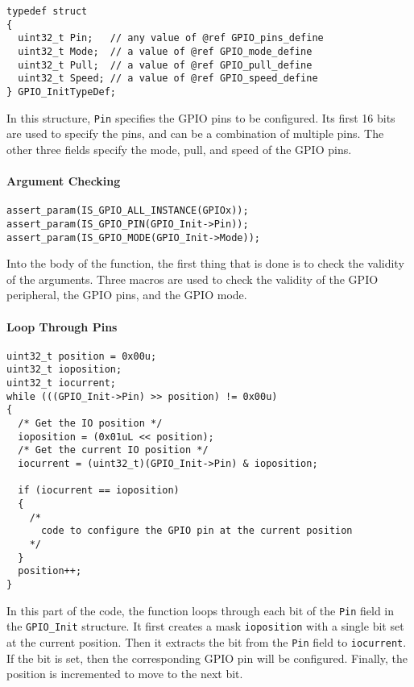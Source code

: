 \documentclass[a4paper,12pt]{article}
\begin{document}
\begin{verbatim}
typedef struct
{
  uint32_t Pin;   // any value of @ref GPIO_pins_define
  uint32_t Mode;  // a value of @ref GPIO_mode_define
  uint32_t Pull;  // a value of @ref GPIO_pull_define
  uint32_t Speed; // a value of @ref GPIO_speed_define
} GPIO_InitTypeDef;    
\end{verbatim}

In this structure, \texttt{Pin} specifies the GPIO pins to be configured. Its first 16 bits are used to specify the pins, and can be a combination of multiple pins. The other three fields specify the mode, pull, and speed of the GPIO pins.

\paragraph{Argument Checking}

\begin{verbatim}
assert_param(IS_GPIO_ALL_INSTANCE(GPIOx));
assert_param(IS_GPIO_PIN(GPIO_Init->Pin));
assert_param(IS_GPIO_MODE(GPIO_Init->Mode));
\end{verbatim}

Into the body of the function, the first thing that is done is to check the validity of the arguments. Three macros are used to check the validity of the GPIO peripheral, the GPIO pins, and the GPIO mode.

\paragraph{Loop Through Pins}

\begin{verbatim}
uint32_t position = 0x00u;
uint32_t ioposition;
uint32_t iocurrent;
while (((GPIO_Init->Pin) >> position) != 0x00u)
{
  /* Get the IO position */
  ioposition = (0x01uL << position);
  /* Get the current IO position */
  iocurrent = (uint32_t)(GPIO_Init->Pin) & ioposition;

  if (iocurrent == ioposition)
  {
    /*
      code to configure the GPIO pin at the current position
    */
  }
  position++;
}
\end{verbatim}

In this part of the code, the function loops through each bit of the \texttt{Pin} field in the \texttt{GPIO\_Init} structure. It first creates a mask \texttt{ioposition} with a single bit set at the current position. Then it extracts the bit from the \texttt{Pin} field to \texttt{iocurrent}. If the bit is set, then the corresponding GPIO pin will be configured. Finally, the position is incremented to move to the next bit.
\end{document}
